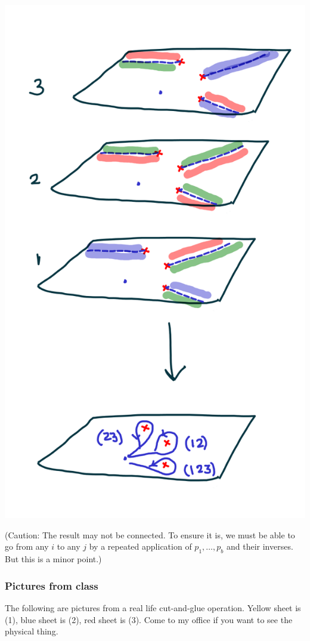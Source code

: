 \documentclass[11pt]{article}
\begin{document}
\begin{center}
\includegraphics[width=.9\linewidth]{assets/Course_notes/2023-03-24_15-09-45_screenshot.png}
\end{center}
(Caution: The result may not be connected.  To ensure it is, we must be able to go from any \(i\) to any \(j\) by a repeated application of \(p_1, \dots, p_{b}\) and their inverses.  But this is a minor point.)
\subsubsection{Pictures from class}
\label{sec:org0b63f4e}
The following are pictures from a real life cut-and-glue operation.  Yellow sheet is (1), blue sheet is (2), red sheet is (3).  Come to my office if you want to see the physical thing.
\end{document}
